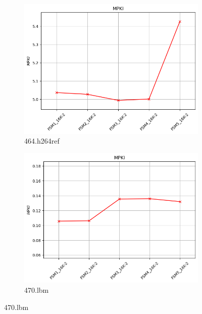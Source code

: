 \documentclass{article}
\begin{document}
 \begin{figure}[H]
     \ContinuedFloat
     \centering
 
     \begin{subfigure}[b]{0.45\textwidth}
         \includegraphics[width=\textwidth]{figures/5_3_b/464.h264ref.cslab_branch_preds_ref.out.png}
         \caption{464.h264ref}
         \label{fig:plot29}
     \end{subfigure}
     \hfill
     \begin{subfigure}[b]{0.45\textwidth}
         \includegraphics[width=\textwidth]{figures/5_3_b/470.lbm.cslab_branch_preds_ref.out.png}
         \caption{470.lbm}
         \label{fig:plot30}
     \end{subfigure}
 

\end{figure}
\end{document}
